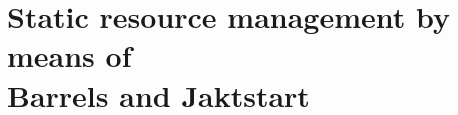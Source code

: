 \documentclass[../main/report.tex]{subfiles}
\begin{document}
\section{Static resource management by means of\\
Barrels and Jaktstart}
\end{document}
